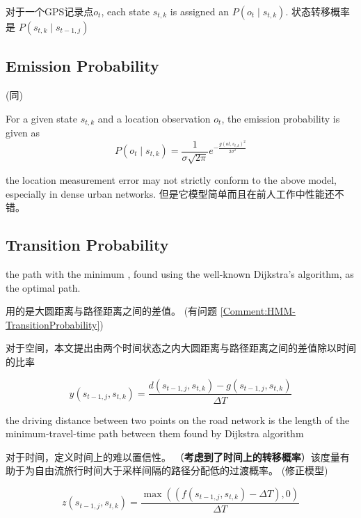 对于一个GPS记录点$ o_{t} $, each state $ s_{t, k} $ is assigned an  $ P\left(o_{t} \mid s_{t, k}\right) $.  状态转移概率是 $ P\left(s_{t, k} \mid s_{t-1, j}\right) $

\subsection{Emission Probability}

(同\cite{newson2009hidden})

For a given state $ s_{t, k} $ and a location observation $ o_{t} $, the emission probability is given as
\begin{equation}
P\left(o_{t} \mid s_{t, k}\right)=\frac{1}{\sigma \sqrt{2 \pi}} e^{-\frac{g\left(o t, s_{t, k}\right)^{2}}{2 \sigma^{2}}}
\end{equation}

\begin{remark}
    the location measurement error may not strictly conform to the above model, especially in dense urban networks. 但是它模型简单而且在前人工作中性能还不错。 
\end{remark}

\subsection{Transition Probability}

the path with the minimum , found using
the well-known Dijkstra's algorithm, as the optimal path.

\cite{newson2009hidden}用的是大圆距离与路径距离之间的差值。 (有问题 \ref{Comment:HMM-TransitionProbability})

对于空间，本文提出由两个时间状态之内大圆距离与路径距离之间的差值除以时间的比率

\begin{equation} y\left(s_{t-1, j}, s_{t, k}\right)=\frac{d\left(s_{t-1, j}, s_{t, k}\right)-g\left(s_{t-1, j}, s_{t, k}\right)}{\Delta T} \end{equation}

the driving distance
between two points on the road network is the length of the
minimum-travel-time path between them found by Dijkstra
algorithm

对于时间，定义时间上的难以置信性。 （\textbf{考虑到了时间上的转移概率}）该度量有助于为自由流旅行时间大于采样间隔的路径分配低的过渡概率。 (修正模型)

\begin{equation}
z\left(s_{t-1, j}, s_{t, k}\right)=\frac{\max \left(\left(f\left(s_{t-1, j}, s_{t, k}\right)-\Delta T\right), 0\right)}{\Delta T}
\end{equation}

